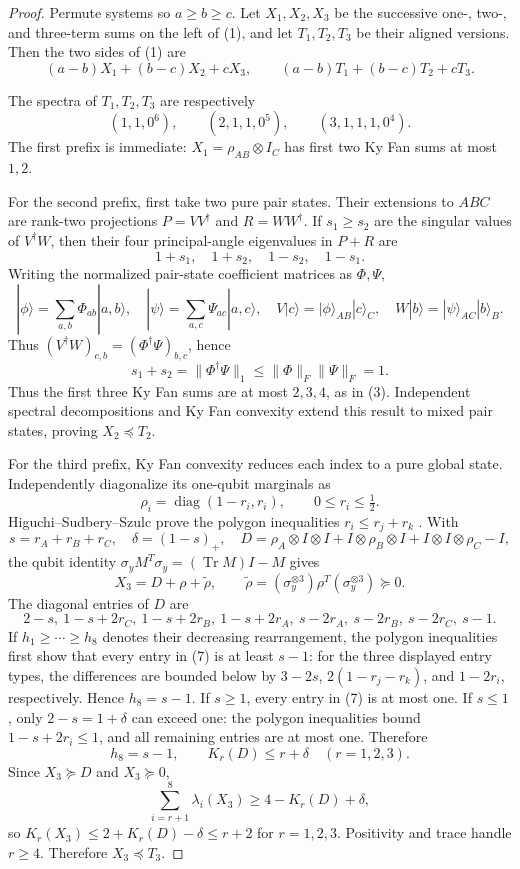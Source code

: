 \documentclass[11pt]{article}
\newcommand{\Tr}{\operatorname{Tr}}
\newcommand{\KF}{K}
\begin{document}
\begin{proof}
Permute systems so \(a\ge b\ge c\).  Let \(X_1,X_2,X_3\) be the successive
one-, two-, and three-term sums on the left of (1), and let \(T_1,T_2,T_3\)
be their aligned versions.  Then the two sides of (1) are
\[
(a-b)X_1+(b-c)X_2+cX_3,\qquad
(a-b)T_1+(b-c)T_2+cT_3. \tag{2}
\]

The spectra of \(T_1,T_2,T_3\) are respectively
\[
(1,1,0^6),\qquad(2,1,1,0^5),\qquad(3,1,1,1,0^4). \tag{3}
\]
The first prefix is immediate: \(X_1=\rho_{AB}\otimes I_C\) has first two
Ky Fan sums at most \(1,2\).

For the second prefix, first take two pure pair states.  Their extensions to
\(ABC\) are rank-two projections \(P=VV^\dagger\) and \(R=WW^\dagger\).
If \(s_1\ge s_2\) are the singular values of \(V^\dagger W\), then their
four principal-angle eigenvalues in \(P+R\) are
\[
1+s_1,\quad1+s_2,\quad1-s_2,\quad1-s_1. \tag{4}
\]
Writing the normalized pair-state coefficient matrices as \(\Phi,\Psi\),
\[
|\phi\rangle=\sum_{a,b}\Phi_{ab}|a,b\rangle,\quad
|\psi\rangle=\sum_{a,c}\Psi_{ac}|a,c\rangle,\quad
V|c\rangle=|\phi\rangle_{AB}|c\rangle_C,\quad
W|b\rangle=|\psi\rangle_{AC}|b\rangle_B.
\]
Thus \((V^\dagger W)_{c,b}=(\Phi^\dagger\Psi)_{b,c}\), hence
\[
s_1+s_2=\|\Phi^\dagger\Psi\|_1\le\|\Phi\|_F\|\Psi\|_F=1. \tag{5}
\]
Thus the first three Ky Fan sums are at most \(2,3,4\), as in (3).
Independent spectral decompositions and Ky Fan convexity extend this result
to mixed pair states, proving \(X_2\preceq T_2\).

For the third prefix, Ky Fan convexity reduces each index to a pure global
state.  Independently diagonalize its one-qubit marginals as
\[
\rho_i=\operatorname{diag}(1-r_i,r_i),\qquad0\le r_i\le\tfrac12.
\]
Higuchi--Sudbery--Szulc prove the polygon inequalities
\(r_i\le r_j+r_k\) \cite[Eq.~(2), p.~1]{Higuchi}.  With
\[
s=r_A+r_B+r_C,\quad\delta=(1-s)_+,\quad
D=\rho_A\otimes I\otimes I+I\otimes\rho_B\otimes I+
I\otimes I\otimes\rho_C-I,
\]
the qubit identity
\(\sigma_yM^T\sigma_y=(\Tr M)I-M\) gives
\[
X_3=D+\rho+\widetilde\rho,\qquad
\widetilde\rho=(\sigma_y^{\otimes3})\rho^T(\sigma_y^{\otimes3})\succeq0.
\tag{6}
\]
The diagonal entries of \(D\) are
\[
2-s,\ 1-s+2r_C,\ 1-s+2r_B,\ 1-s+2r_A,\
s-2r_A,\ s-2r_B,\ s-2r_C,\ s-1. \tag{7}
\]
If \(h_1\ge\cdots\ge h_8\) denotes their decreasing rearrangement, the
polygon inequalities first show that every entry in (7) is at least \(s-1\):
for the three displayed entry types, the differences are bounded below by
\(3-2s\), \(2(1-r_j-r_k)\), and \(1-2r_i\), respectively. Hence
\(h_8=s-1\). If \(s\ge1\), every entry in (7) is at most one. If
\(s\le1\), only \(2-s=1+\delta\) can exceed one: the polygon inequalities
bound \(1-s+2r_i\le1\), and all remaining entries are at most one. Therefore
\[
h_8=s-1,\qquad\KF_r(D)\le r+\delta\quad(r=1,2,3). \tag{8}
\]
Since \(X_3\succeq D\) and \(X_3\succeq0\),
\[
\sum_{i=r+1}^{8}\lambda_i(X_3)
\ge4-\KF_r(D)+\delta,
\]
so \(\KF_r(X_3)\le2+\KF_r(D)-\delta\le r+2\) for \(r=1,2,3\).
Positivity and trace handle \(r\ge4\).  Therefore \(X_3\preceq T_3\).


\end{proof}
\end{document}
